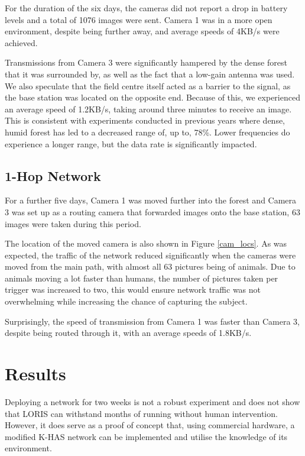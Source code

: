 		For the duration of the six days, the cameras did not report a drop in battery levels and a total of 1076 images were sent. Camera 1 was in a more open environment, despite being further away, and average speeds of 4KB/s were achieved. 
		
		Transmissions from Camera 3 were significantly hampered by the dense forest that it was surrounded by, as well as the fact that a low-gain antenna was used. We also speculate that the field centre itself acted as a barrier to the signal, as the base station was located on the opposite end. Because of this, we experienced an average speed of 1.2KB/s, taking around three minutes to receive an image. This is consistent with experiments conducted in previous years where dense, humid forest has led to a decreased range of, up to, 78\%. Lower frequencies do experience a longer range, but the data rate is significantly impacted.
		
		\subsection{1-Hop Network}
		For a further five days, Camera 1 was moved further into the forest and Camera 3 was set up as a routing camera that forwarded images onto the base station, 63 images were taken during this period.
		
		The location of the moved camera is also shown in Figure \ref{cam_locs}. As was expected, the traffic of the network reduced significantly when the cameras were moved from the main path, with almost all 63 pictures being of animals. Due to animals moving a lot faster than humans, the number of pictures taken per trigger was increased to two, this would ensure network traffic was not overwhelming while increasing the chance of capturing the subject.
		
		Surprisingly, the speed of transmission from Camera 1 was faster than Camera 3, despite being routed through it, with an average speeds of 1.8KB/s.				
		\section{Results}\label{loris:res}
		Deploying a network for two weeks is not a robust experiment and does not show that LORIS can withstand months of running without human intervention. However, it does serve as a proof of concept that, using commercial hardware, a modified K-HAS network can be implemented and utilise the knowledge of its environment.
		
